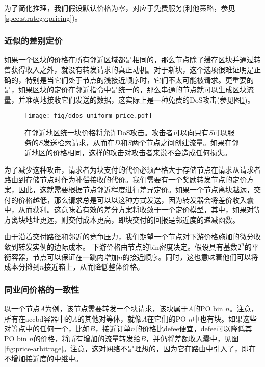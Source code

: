 为了简化推理，我们假设默认价格为零，对应于免费服务(利他策略，参见\ref{spec:strategy:pricing})。 

\subsubsection{近似的差别定价}\label{sec:diff-pricing-prox}

如果一个区块的价格在所有邻近区域都是相同的，那么节点除了缓存区块并通过转售获得收入之外，就没有转发请求的真正动机。对于新块，这个选项很难证明是正确的，特别是当它们处于节点的浅接近顺序时，它们不太可能被请求。更重要的是，如果区块的定价在邻近指令中是统一的，那么串通的节点就可以生成区块流量，并准确地接收它们发送的数据，这实际上是一种免费的DoS攻击(参见图\ref{fig:ddos-uniform-price})。

\begin{figure}[htbp]
   \centering
   \texttt{[image: fig/ddos-uniform-price.pdf]}
   \caption[统一的区块价格将允许DoS \statusgreen]{在邻近地区统一块价格将允许DoS攻击。攻击者可以向只有$S$可以服务的$S$发送检索请求，从而在$D$和$S$两个节点之间创建流量。如果在邻近地区的价格相同，这样的攻击对攻击者来说不会造成任何损失。}
   \label{fig:ddos-uniform-price}
\end{figure}

为了减少这种攻击，请求者为块支付的代价必须严格大于存储节点在请求从请求者路由到存储节点时作为补偿接收的代价。我们需要有一个奖励转发节点的定价方案，因此，这就需要根据节点邻近程度进行差异定价。如果一个节点离块越远，交付的价格越低，那么请求总是可以以这种方式发送，因为转发器会将差价收入囊中，从而获利。这意味着有效的差分方案将收敛于一个定价模型，其中，如果对等方离块地址更远，则交付成本更高，即块交付的回报是邻近度的递减函数。

由于沿着交付路径和邻近的竞争压力，我们期望一个节点对下游价格施加的微分收敛到转发实例的边际成本。
下游价格由节点的bin密度决定。假设具有基数$2^n$的平衡容器，节点可以保证在一跳内增加$n$的接近顺序。同时，这也意味着他们可以将成本分摊到$n$接近箱上，从而降低整体价格。


\subsubsection{同业间价格的一致性}

以一个节点$A$为例，该节点需要转发一个块请求，该块属于$A$的PO bin $n$。注意，所有在accbd容器中的$A$的其他对等体，就像$A$在它们的PO $n$中也有块。如果这些对等点中的任何一个，比如$B$，接近订单$n$的价格比defee便宜，defee可以降低其PO bin $n$的价格，将所有增加的流量转发给$B$，并仍将差额收入囊中，见图\ref{fig:price-arbitrage}。注意，这对网络不是理想的，因为它在路由中引入了，即在不增加接近度的中继中。 


